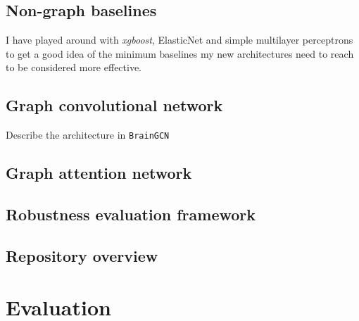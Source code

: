 \documentclass[12pt,a4paper,twoside, openright, hidelinks]{report}
\begin{document}
\section{Non-graph baselines}
I have played around with \textit{xgboost}, ElasticNet and simple multilayer perceptrons to get a good idea of the minimum baselines my new architectures need to reach to be considered more effective.

\section{Graph convolutional network}
Describe the architecture in \texttt{BrainGCN}

\section{Graph attention network}

\section{Robustness evaluation framework}

\section{Repository overview}

\chapter{Evaluation}
\end{document}
